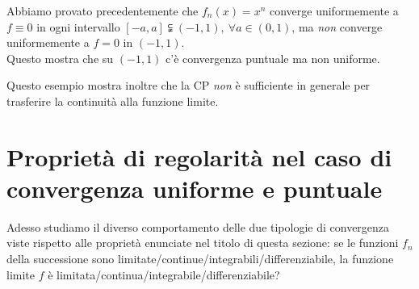 Abbiamo provato precedentemente che $f_n\left(x\right)=x^n$ converge uniformemente a $f\equiv 0$ in ogni intervallo $\left[-a,a\right]\subsetneqq\left(-1,1\right),\ \forall a\in\left(0,1\right)$, ma \textit{non} converge uniformemente a $f=0$ in $\left(-1,1\right)$.\\
Questo mostra che su $\left(-1,1\right)$ c'è convergenza puntuale ma non uniforme.
\begin{observe}
	Questo esempio mostra inoltre che la CP \textit{non} è sufficiente in generale per trasferire la continuità alla funzione limite.
\end{observe}
\section{Proprietà di regolarità nel caso di convergenza uniforme e puntuale}
Adesso studiamo il diverso comportamento delle due tipologie di convergenza viste rispetto alle proprietà enunciate nel titolo di questa sezione: se le funzioni $f_n$ della successione sono limitate/continue/integrabili/differenziabile, la funzione limite $f$ è limitata/continua/integrabile/differenziabile?
